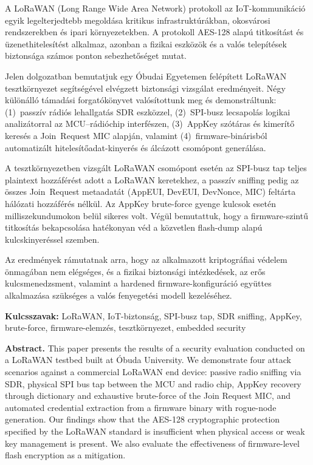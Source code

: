 \documentclass[12pt,a4paper]{article}
\begin{document}
A LoRaWAN (Long Range Wide Area Network) protokoll az IoT-kommunikáció egyik
legelterjedtebb megoldása kritikus infrastruktúrákban, okosvárosi rendszerekben
és ipari környezetekben. A protokoll AES-128 alapú titkosítást és
üzenethitelesítést alkalmaz, azonban a fizikai eszközök és a valós telepítések
biztonsága számos ponton sebezhetőséget mutat.

Jelen dolgozatban bemutatjuk egy Óbudai Egyetemen felépített LoRaWAN
tesztkörnyezet segítségével elvégzett biztonsági vizsgálat eredményeit.
Négy különálló támadási forgatókönyvet valósítottunk meg és demonstráltunk:
(1)~passzív rádiós lehallgatás SDR eszközzel, (2)~SPI-busz lecsapolás
logikai analizátorral az MCU--rádióchip interfészen, (3)~AppKey szótáras és
kimerítő keresés a Join~Request MIC alapján, valamint (4)~firmware-binárisból
automatizált hitelesítőadat-kinyerés és álcázott csomópont generálása.

A tesztkörnyezetben vizsgált LoRaWAN csomópont esetén az SPI-busz tap teljes
plaintext hozzáférést adott a LoRaWAN keretekhez, a passzív sniffing pedig az
összes Join~Request metaadatát (AppEUI, DevEUI, DevNonce, MIC) feltárta
hálózati hozzáférés nélkül. Az AppKey brute-force gyenge kulcsok esetén
milliszekundumokon belül sikeres volt. Végül bemutattuk, hogy a firmware-szintű
titkosítás bekapcsolása hatékonyan véd a közvetlen flash-dump alapú
kulcskinyeréssel szemben.

Az eredmények rámutatnak arra, hogy az alkalmazott kriptográfiai védelem
önmagában nem elégséges, és a fizikai biztonsági intézkedések, az erős
kulcsmenedzsment, valamint a hardened firmware-konfiguráció együttes alkalmazása
szükséges a valós fenyegetési modell kezeléséhez.

\bigskip
\noindent\textbf{Kulcsszavak:} LoRaWAN, IoT-biztonság, SPI-busz tap,
SDR sniffing, AppKey, brute-force, firmware-elemzés, tesztkörnyezet, embedded
security

\bigskip
\noindent\textbf{Abstract.} This paper presents the results of a security
evaluation conducted on a LoRaWAN testbed built at Óbuda University.
We demonstrate four attack scenarios against a commercial LoRaWAN end device:
passive radio sniffing via SDR, physical SPI bus tap between the MCU and radio
chip, AppKey recovery through dictionary and exhaustive brute-force of the
Join Request MIC, and automated credential extraction from a firmware binary
with rogue-node generation. Our findings show that the AES-128 cryptographic
protection specified by the LoRaWAN standard is insufficient when physical
access or weak key management is present. We also evaluate the effectiveness
of firmware-level flash encryption as a mitigation.
\end{document}
